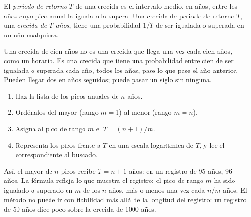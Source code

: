 \begin{definition}\label{def:g10:drainage-basins:return-period}
El \emph{periodo de retorno} $T$ de una crecida es
el intervalo medio, en años, entre los años cuyo pico anual la iguala o la
supera. Una crecida de periodo de retorno $T$, una \emph{crecida de $T$ años},
tiene una probabilidad $1/T$ de ser igualada o superada en un año cualquiera.
\end{definition}

Una crecida de cien años no es una crecida que llega una vez cada cien años,
como un horario. Es una crecida que tiene una probabilidad entre cien de ser
igualada o superada cada año, todos los años, pase lo que pase el año
anterior. Pueden llegar dos en años seguidos; puede pasar un siglo sin
ninguna.

\begin{method}\label{met:g10:drainage-basins:return-periods}
\begin{enumerate}
  \item Haz la lista de los picos anuales de $n$ años.
  \item Ordénalos del mayor (rango $m = 1$) al menor
        (rango $m = n$).
  \item Asigna al pico de rango $m$ el  $T = (n + 1)/m$.
  \item Representa los picos frente a $T$ en una escala logarítmica de $T$,
        y lee el  correspondiente al  buscado.
\end{enumerate}
\end{method}

Así, el mayor de $n$ picos recibe $T = n + 1$ años: en un registro de
\num{95} años, \num{96} años. La fórmula refleja lo que muestra el registro:
el pico de rango $m$ ha sido igualado o superado en $m$ de los $n$ años, más
o menos una vez cada $n/m$ años. El método no puede ir con fiabilidad más
allá de la longitud del registro: un registro de \num{50} años dice poco
sobre la crecida de \num{1000} años.

